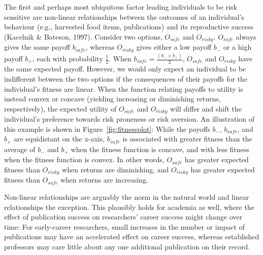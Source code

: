 \documentclass[british,,man,mask,floatsintext]{apa6}
\begin{document}
The first and perhaps most ubiquitous factor leading individuals to be risk sensitive are non-linear relationships between the outcomes of an individual's behaviour (e.g., harvested food items, publications) and its reproductive success (Kacelnik \& Bateson, 1997).
Consider two options, \(O_{safe}\) and \(O_{risky}\).
\(O_{safe}\) always gives the same payoff \(b_{safe}\), whereas \(O_{risky}\) gives either a low payoff \(b_-\) or a high payoff \(b_+\), each with probability \(\frac{1}{2}\).
When \(b_{safe} = \frac{(b_- + b_+)}{2}\), \(O_{safe}\) and \(O_{risky}\) have the same expected payoff.
However, we would only expect an individual to be indifferent between the two options if the consequences of their payoffs for the individual's fitness are linear.
When the function relating payoffs to utility is instead convex or concave (yielding increasing or diminishing returns, respectively), the expected utility of \(O_{safe}\) and \(O_{risky}\) will differ and shift the individual's preference towards risk proneness or risk aversion.
An illustration of this example is shown in Figure~\ref{fig:fitnessplot}:
While the payoffs \(b_-\), \(b_{safe}\), and \(b_+\) are equidistant on the x-axis, \(b_{safe}\) is associated with greater fitness than the average of \(b_-\) and \(b_+\) when the fitness function is concave, and with less fitness when the fitness function is convex.
In other words, \(O_{safe}\) has greater expected fitness than \(O_{risky}\) when returns are diminishing, and \(O_{risky}\) has greater expected fitness than \(O_{safe}\) when returns are increasing.

Non-linear relationships are arguably the norm in the natural world and linear relationships the exception.
This plausibly holds for academia as well, where the effect of publication success on researchers' career success might change over time:
For early-career researchers, small increases in the number or impact of publications may have an accelerated effect on career success, whereas established professors may care little about any one additional publication on their record.
\end{document}
